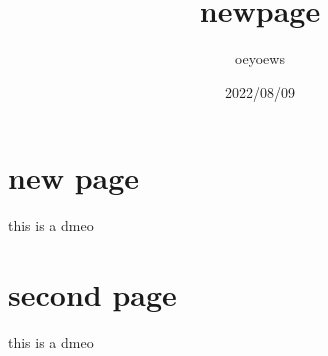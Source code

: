 \documentclass{article}
\title{newpage}
\author{oeyoews}
\date{2022/08/09}
\begin{document}
\maketitle


\section{new page}%
\label{sec:new page}

this is a dmeo

\newpage

\section{second page}%
\label{sec:second page}

this is a dmeo
\end{document}
